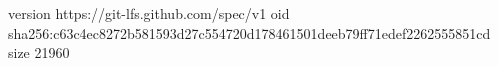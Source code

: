 version https://git-lfs.github.com/spec/v1
oid sha256:c63c4ec8272b581593d27c554720d178461501deeb79ff71edef2262555851cd
size 21960

